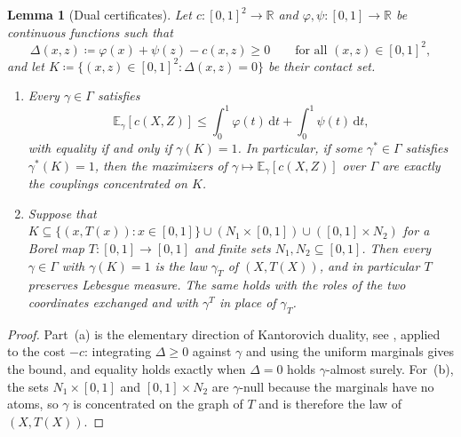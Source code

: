 \documentclass[11pt,a4paper]{article}
\newtheorem{lemma}[theorem]{Lemma}
\theoremstyle{remark}
\newcommand{\E}{\mathbb{E}}
\newcommand{\R}{\mathbb{R}}
\newcommand{\de}{\,\mathrm{d}}
\newcommand{\1}{\mathbf{1}}
\newcommand{\Gam}{\Gamma}
\begin{document}
\begin{lemma}[Dual certificates]
\label{lem:dual-certificate}
Let $c:[0,1]^2\to\R$ and $\varphi,\psi:[0,1]\to\R$ be continuous functions such that
\[
  \Delta(x,z)\coloneqq\varphi(x)+\psi(z)-c(x,z)\ge0
  \qquad\text{for all }(x,z)\in[0,1]^2,
\]
and let $K\coloneqq\{(x,z)\in[0,1]^2:\Delta(x,z)=0\}$ be their contact set.
\begin{enumerate}[label=(\alph*),leftmargin=2em]
\item
Every $\gamma\in\Gam$ satisfies
\[
  \E_\gamma[c(X,Z)]\le\int_0^1\varphi(t)\de t+\int_0^1\psi(t)\de t,
\]
with equality if and only if $\gamma(K)=1$.
In particular, if some $\gamma^*\in\Gam$ satisfies $\gamma^*(K)=1$, then the maximizers of $\gamma\mapsto\E_\gamma[c(X,Z)]$ over $\Gam$ are exactly the couplings concentrated on $K$.
\item
Suppose that $K\subseteq\{(x,T(x)):x\in[0,1]\}\cup(N_1\times[0,1])\cup([0,1]\times N_2)$ for a Borel map $T:[0,1]\to[0,1]$ and finite sets $N_1,N_2\subseteq[0,1]$.
Then every $\gamma\in\Gam$ with $\gamma(K)=1$ is the law $\gamma_T$ of $(X,T(X))$, and in particular $T$ preserves Lebesgue measure.
The same holds with the roles of the two coordinates exchanged and with $\gamma^T$ in place of $\gamma_T$.
\end{enumerate}
\end{lemma}

\begin{proof}
Part~(a) is the elementary direction of Kantorovich duality, see \cite[Thm.~5.10]{villani2009optimal}, applied to the cost $-c$: integrating $\Delta\ge0$ against $\gamma$ and using the uniform marginals gives the bound, and equality holds exactly when $\Delta=0$ holds $\gamma$-almost surely.
For~(b), the sets $N_1\times[0,1]$ and $[0,1]\times N_2$ are $\gamma$-null because the marginals have no atoms, so $\gamma$ is concentrated on the graph of $T$ and is therefore the law of $(X,T(X))$.
\end{proof}
\end{document}
